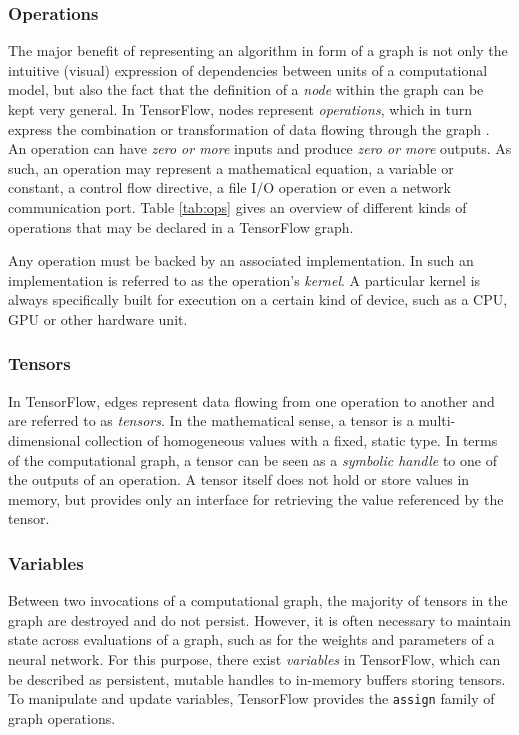 \subsubsection{Operations}\label{sec:model-graphs-ops}

The major benefit of representing an algorithm in form of a graph is not only
the intuitive (visual) expression of dependencies between units of a
computational model, but also the fact that the definition of a \emph{node}
within the graph can be kept very general. In TensorFlow, nodes represent
\emph{operations}, which in turn express the combination or transformation of
data flowing through the graph \cite{tensorflow}. An operation can have
\emph{zero or more} inputs and produce \emph{zero or more} outputs. As such, an
operation may represent a mathematical equation, a variable or constant, a
control flow directive, a file I/O operation or even a network communication
port. Table \ref{tab:ops} gives an overview of different kinds of operations
that may be declared in a TensorFlow graph.

Any operation must be backed by an associated implementation. In
\cite{tensorflow} such an implementation is referred to as the operation's
\emph{kernel}. A particular kernel is always specifically built for execution on
a certain kind of device, such as a CPU, GPU or other hardware unit.

\subsubsection{Tensors}\label{sec:model-graphs-tensors}

In TensorFlow, edges represent data flowing from one operation to another and
are referred to as \emph{tensors}. In the mathematical sense, a tensor is a
multi-dimensional collection of homogeneous values with a fixed, static type. In
terms of the computational graph, a tensor can be seen as a \emph{symbolic
  handle} to one of the outputs of an operation. A tensor itself does not hold
or store values in memory, but provides only an interface for retrieving the
value referenced by the tensor.

\subsubsection{Variables}\label{sec:model-graphs-vars}

Between two invocations of a computational graph, the majority of tensors in the
graph are destroyed and do not persist. However, it is often necessary to
maintain state across evaluations of a graph, such as for the weights and
parameters of a neural network. For this purpose, there exist \emph{variables}
in TensorFlow, which can be described as persistent, mutable handles to
in-memory buffers storing tensors. To manipulate and update variables,
TensorFlow provides the \texttt{assign} family of graph operations.

